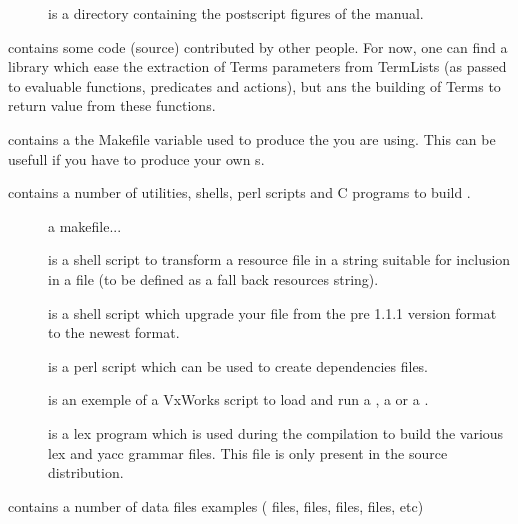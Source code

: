 \begin{description}
\begin{description}
\item [] is a directory containing the postscript figures of the
manual.

\end{description}

\item [\file{contrib}] contains some code (source) contributed by other people.
For now, one can find a library which ease the extraction of Terms parameters
from TermLists (as passed to evaluable functions, predicates and actions), but
ans the building of Terms to return value from these functions.

\item [\file{site.make}] contains a the Makefile variable used to produce the
\COPRSDE{} you are using. This can be usefull if you have to produce your own
\PK{}s.

\item [\file{util}] contains a number of utilities, shells, perl scripts and C
programs to build \COPRS{}.

\begin{description}

\item [] a makefile...

\item [] is a shell script to transform a  resource file
in a string suitable for inclusion in a  file (to be defined as a
fall back resources string).

\item [] is a shell script which upgrade your 
file from the pre 1.1.1 version format to the newest format.

\item [] is a perl script which can be used to create dependencies
files.

\item [] is an exemple of a VxWorks script to load and run a
\CPK{}, a \MP{} or a \MPK{}.

\item [] is a lex program which is used during the \COPRS{}
compilation to build the various lex and yacc grammar files. This file is only
present in the source distribution.

\end{description}

\item [\file{data}] contains a number of data files examples (
files,  files,  files,  files, etc)


\end{description}
